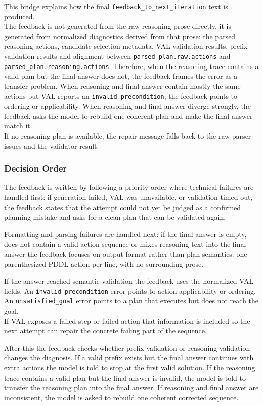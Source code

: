 This bridge explains how the final \texttt{feedback\_to\_next\_iteration} text is produced.\\
The feedback is not generated from the raw reasoning prose directly, it is generated from normalized diagnostics derived from that prose: the parsed reasoning actions, candidate-selection metadata, VAL validation results, prefix validation results and alignment between \texttt{parsed\_plan.raw.actions} and \texttt{parsed\_plan.reasoning.actions}. Therefore, when the reasoning trace contains a valid plan but the final answer does not, the feedback frames the error as a transfer problem. When reasoning and final answer contain mostly the same actions but VAL reports an \texttt{invalid\_precondition}, the feedback points to ordering or applicability. When reasoning and final answer diverge strongly, the feedback asks the model to rebuild one coherent plan and make the final answer match it.\\
If no reasoning plan is available, the repair message falls back to the raw parser issues and the validator result.

\subsubsection{Decision Order}

The feedback is written by following a priority order where technical failures are
handled first: if generation failed, VAL was unavailable, or validation timed
out, the feedback states that the attempt could not yet be judged as a confirmed
planning mistake and asks for a clean plan that can be validated again.

Formatting and parsing failures are handled next: if the final answer is empty,
does not contain a valid action sequence or mixes reasoning text into the final
answer the feedback focuses on output format rather than plan semantics: one
parenthesized PDDL action per line, with no surrounding prose.

If the answer reached semantic validation the feedback uses the normalized VAL fields. An \texttt{invalid\_precondition} error points to action applicability or ordering. An \texttt{unsatisfied\_goal} error points to a plan that executes but does not reach the goal.\\
If VAL exposes a failed step or failed action that information is included so the next attempt can repair the concrete failing part of the sequence.

After this the feedback checks whether prefix validation or reasoning validation changes the diagnosis. If a valid prefix exists but the final answer continues with extra actions the model is told to stop at the first valid solution. If the reasoning trace contains a valid plan but the final answer is invalid, the model is told to transfer the reasoning plan into the final answer. If reasoning and final answer are inconsistent, the model is asked to rebuild one coherent corrected sequence.


